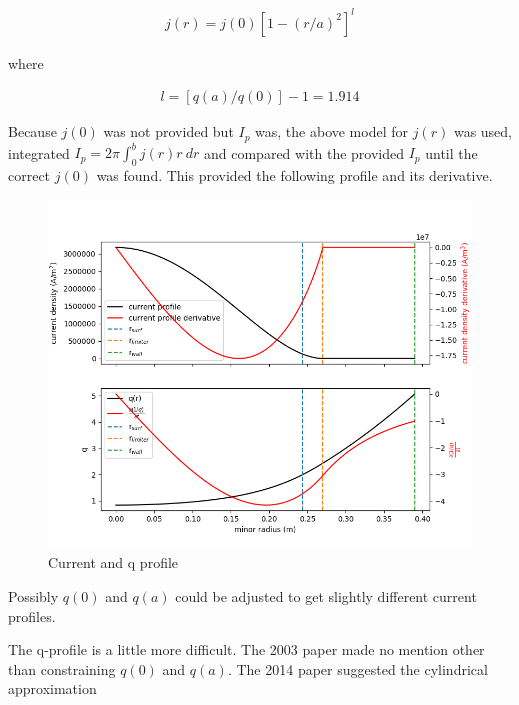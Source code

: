 \documentclass{article}
\begin{document}
\begin{equation} \label{wessonCurrentProfile}
\begin{split}
j(r)=j(0) \left[ 1-(r/a)^2 \right]^l
\end{split} 
\end{equation} 

\noindent where 

\begin{equation} \label{j}
\begin{split}
l=\left[ q(a)/q(0)\right]-1 = 1.914
\end{split} 
\end{equation} 

Because $j(0)$ was not provided but $I_p$ was, the above model for $j(r)$ was used, integrated $I_p = 2\pi \int_0^b j(r)r \ dr$ and compared with the provided $I_p$ until the correct $j(0)$ was found.  This provided the following profile and its derivative.


\begin{figure}[htb]
	\includegraphics[width=15cm]{images/jAndQ.png}
	\caption{Current and q profile
		\label{fig:jAndQ}}    
\end{figure}  

\noindent Possibly $q(0)$ and $q(a)$ could be adjusted to get slightly different current profiles.  


The q-profile is a little more difficult.  The 2003 paper made no mention other than constraining $q(0)$ and $q(a)$.  The 2014 paper suggested the cylindrical approximation
\end{document}
